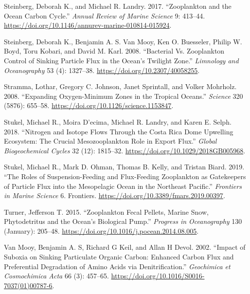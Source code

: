 \documentclass[]{article}
\begin{document}
\leavevmode\hypertarget{ref-steinbergZooplanktonOceanCarbon2017}{}%
Steinberg, Deborah K., and Michael R. Landry. 2017. ``Zooplankton and
the Ocean Carbon Cycle.'' \emph{Annual Review of Marine Science} 9:
413--44. \url{https://doi.org/10.1146/annurev-marine-010814-015924}.

\leavevmode\hypertarget{ref-steinbergBacterialVsZooplankton2008}{}%
Steinberg, Deborah K., Benjamin A. S. Van Mooy, Ken O. Buesseler, Philip
W. Boyd, Toru Kobari, and David M. Karl. 2008. ``Bacterial Vs.
Zooplankton Control of Sinking Particle Flux in the Ocean's Twilight
Zone.'' \emph{Limnology and Oceanography} 53 (4): 1327--38.
\url{https://doi.org/10.2307/40058255}.

\leavevmode\hypertarget{ref-strammaExpandingOxygenMinimumZones2008}{}%
Stramma, Lothar, Gregory C. Johnson, Janet Sprintall, and Volker
Mohrholz. 2008. ``Expanding Oxygen-Minimum Zones in the Tropical
Oceans.'' \emph{Science} 320 (5876): 655--58.
\url{https://doi.org/10.1126/science.1153847}.

\leavevmode\hypertarget{ref-stukelNitrogenIsotopeFlows2018}{}%
Stukel, Michael R., Moira D\a'ecima, Michael R. Landry, and Karen E.
Selph. 2018. ``Nitrogen and Isotope Flows Through the Costa Rica Dome
Upwelling Ecosystem: The Crucial Mesozooplankton Role in Export Flux.''
\emph{Global Biogeochemical Cycles} 32 (12): 1815--32.
\url{https://doi.org/10.1029/2018GB005968}.

\leavevmode\hypertarget{ref-stukelRolesSuspensionFeedingFluxFeeding2019}{}%
Stukel, Michael R., Mark D. Ohman, Thomas B. Kelly, and Tristan Biard.
2019. ``The Roles of Suspension-Feeding and Flux-Feeding Zooplankton as
Gatekeepers of Particle Flux into the Mesopelagic Ocean in the Northeast
Pacific.'' \emph{Frontiers in Marine Science} 6. Frontiers.
\url{https://doi.org/10.3389/fmars.2019.00397}.

\leavevmode\hypertarget{ref-turnerZooplanktonFecalPellets2015}{}%
Turner, Jefferson T. 2015. ``Zooplankton Fecal Pellets, Marine Snow,
Phytodetritus and the Ocean's Biological Pump.'' \emph{Progress in
Oceanography} 130 (January): 205--48.
\url{https://doi.org/10.1016/j.pocean.2014.08.005}.

\leavevmode\hypertarget{ref-vanmooyImpactSuboxiaSinking2002}{}%
Van Mooy, Benjamin A. S, Richard G Keil, and Allan H Devol. 2002.
``Impact of Suboxia on Sinking Particulate Organic Carbon: Enhanced
Carbon Flux and Preferential Degradation of Amino Acids via
Denitrification.'' \emph{Geochimica et Cosmochimica Acta} 66 (3):
457--65. \url{https://doi.org/10.1016/S0016-7037(01)00787-6}.
\end{document}
